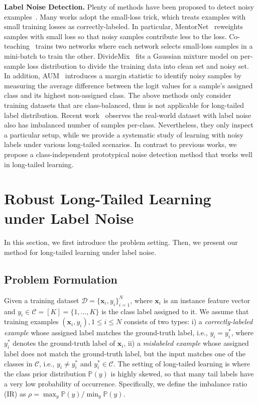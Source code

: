 \documentclass{article}
\def\x{{\boldsymbol x}}
\begin{document}
\textbf{Label Noise Detection.} Plenty of methods have been proposed to detect noisy examples~\cite{jiang2018mentornet,han2018co,li2020dividemix,Nguyen2020self}. Many works adopt the small-loss trick, which treats examples with small training losses as correctly-labeled. In particular, MentorNet~\cite{jiang2018mentornet} reweights samples with small loss so that noisy samples contribute less to the loss.  Co-teaching~\cite{han2018co} trains two networks where each network selects small-loss samples in a mini-batch to train the other. DivideMix~\cite{li2020dividemix} fits a Gaussian mixture model on per-sample loss distribution to divide the training data into clean set and noisy set. In addition, AUM~\cite{pleiss2020identifying} introduces a margin statistic to identify noisy samples by measuring the average difference between the logit values for a sample's assigned class and its highest non-assigned class. The above methods only consider training datasets that are class-balanced, thus is not applicable for long-tailed label distribution. Recent work~\cite{li2021mopro} observes the real-world dataset with label noise also has imbalanced number of samples per-class. Nevertheless, they only inspect a particular setup, while we provide a systematic study of learning with noisy labels under various long-tailed scenarios. In contrast to previous works, we propose a class-independent prototypical noise detection method that works well in long-tailed learning.



 
\section{Robust Long-Tailed Learning under Label Noise}\label{sec:method}
In this section, we first introduce the problem setting. Then, we present our method for long-tailed learning under label noise. 

\subsection{Problem Formulation}
Given a training dataset $\mathcal{D} = \{\x_i, y_i\}_{i=1}^{N}$, where $\x_i$ is an instance feature vector and $y_i \in \mathcal{C} = [K] = \{1, \dots, K\}$ is the class label assigned to it. We assume that training examples $(\x_i, y_i), 1 \leq i \leq N$ consists of two types: i) a \textit{correctly-labeled example} whose assigned label matches the ground-truth label, i.e., $y_i = y_i^{*}$, where $y_i^{*}$ denotes the ground-truth label of $\x_i$, ii) a \textit{mislabeled example} whose assigned label does not match the ground-truth label, but the input matches one of the classes in $\mathcal{C}$, i.e., $y_i \neq y_i^{*}$ and $y_i^{*} \in \mathcal{C}$. The setting of long-tailed learning is where the class prior distribution $\mathbb{P}(y)$ is highly skewed, so that many tail labels have a very low probability of occurrence. Specifically, we define the imbalance ratio (IR) as $\rho = \max_y \mathbb{P}(y) / \min_y \mathbb{P}(y)$.
\end{document}
